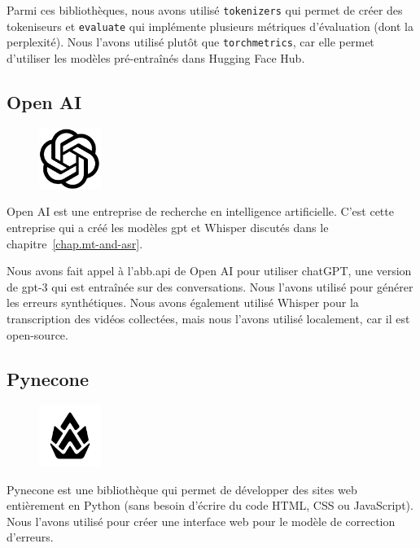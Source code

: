 Parmi ces bibliothèques, nous avons utilisé \verb|tokenizers| qui permet de créer des tokeniseurs
et \verb|evaluate| qui implémente plusieurs métriques d'évaluation (dont la perplexité).
Nous l'avons utilisé plutôt que \verb|torchmetrics|, 
car elle permet d'utiliser les modèles pré-entraînés dans \foreignlanguage{english}{Hugging Face Hub}.

\subsection{\foreignlanguage{english}{Open AI}}
\label{subsec.openai}

\begin{figure}
    \vspace*{-\topsep}
    \begin{flushright}
        \includegraphics[width=2cm]{assets/images/openai.png}
    \end{flushright}
\end{figure}
\foreignlanguage{english}{Open AI} est une entreprise de recherche en intelligence artificielle.
C'est cette entreprise qui a créé les modèles \gls{gpt} et Whisper discutés dans le chapitre~\ref{chap.mt-and-asr}.

Nous avons fait appel à l'\gls{abb.api} de \foreignlanguage{english}{Open AI} pour utiliser chatGPT,
une version de \gls{gpt}-3 qui est entraînée sur des conversations.
Nous l'avons utilisé pour générer les erreurs synthétiques.
Nous avons également utilisé Whisper pour la transcription des vidéos collectées,
mais nous l'avons utilisé localement, car il est open-source.

\subsection{Pynecone}
\label{subsec.pynecone}

\begin{figure}
    \vspace*{-\topsep}
    \begin{flushright}
        \includegraphics[width=2cm]{assets/images/pynecone.png}
    \end{flushright}
\end{figure}

Pynecone est une bibliothèque qui permet de développer des sites web entièrement en Python
(sans besoin d'écrire du code HTML, CSS ou JavaScript).
Nous l'avons utilisé pour créer une interface web pour le modèle de correction d'erreurs.